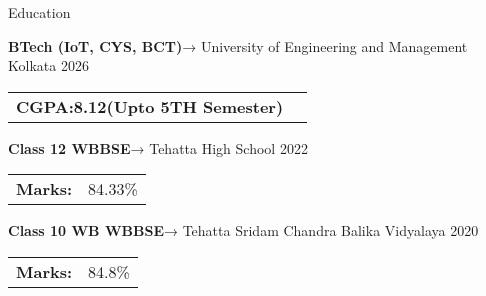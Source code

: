 \documentclass{resume}
\begin{document}

\vspace{-0.4em}
\begin{rSection}{Education}

    {\bf BTech (IoT, CYS, BCT)}→ University of Engineering and Management Kolkata \hfill {2026}\\
    \begin{tabular}{>{\bfseries}l l}
        CGPA:8.12(Upto 5TH Semester)
    \end{tabular}

    \vspace{-0.4em}
    {\bf Class 12 WBBSE}→ Tehatta High School \hfill {2022}\\
    \begin{tabular}{>{\bfseries}l l}
        Marks:    & 84.33\%
    \end{tabular}

    {\bf Class 10 WB WBBSE}→ Tehatta Sridam Chandra Balika Vidyalaya \hfill {2020}\\
    \begin{tabular}{>{\bfseries}l l}
        Marks:    & 84.8\%
    \end{tabular}
\end{rSection}
\vspace{1em}

\end{document}
